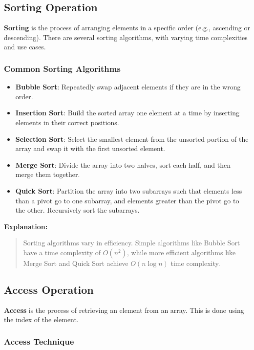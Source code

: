 \documentclass[12pt, oneside]{book}
\begin{document}
\subsection{Sorting Operation}

\textbf{Sorting} is the process of arranging elements in a specific order (e.g., ascending or descending). There are several sorting algorithms, with varying time complexities and use cases.

\subsubsection*{Common Sorting Algorithms}

\begin{itemize}
	\item \textbf{Bubble Sort}: Repeatedly swap adjacent elements if they are in the wrong order.
	\item \textbf{Insertion Sort}: Build the sorted array one element at a time by inserting elements in their correct positions.
	\item \textbf{Selection Sort}: Select the smallest element from the unsorted portion of the array and swap it with the first unsorted element.
	\item \textbf{Merge Sort}: Divide the array into two halves, sort each half, and then merge them together.
	\item \textbf{Quick Sort}: Partition the array into two subarrays such that elements less than a pivot go to one subarray, and elements greater than the pivot go to the other. Recursively sort the subarrays.
\end{itemize}

\textbf{Explanation:}
\begin{quote}
	Sorting algorithms vary in efficiency. Simple algorithms like Bubble Sort have a time complexity of $O(n^2)$, while more efficient algorithms like Merge Sort and Quick Sort achieve $O(n \log n)$ time complexity.
\end{quote}

\subsection{Access Operation}

\textbf{Access} is the process of retrieving an element from an array. This is done using the index of the element.

\subsubsection*{Access Technique}
\end{document}
